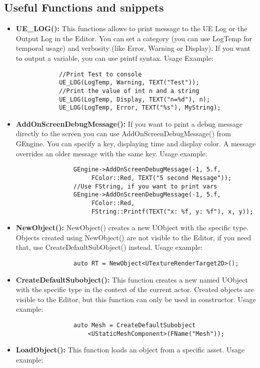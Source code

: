 \documentclass[10pt,a4paper]{article}
\begin{document}
\begin{multicols*}{2}
	\subsection{Useful Functions and snippets}
	\begin{itemize}
			\item \textbf{UE\_LOG():} This functions allows to print message to the UE Log or the Output Log in the Editor. You can set a category (you can use LogTemp for temporal usage) and verbosity (like Error, Warning or Display). If you want to output a variable, you can use printf syntax.  Usage Example:
			\begin{verbatim}
			//Print Test to console
			UE_LOG(LogTemp, Warning, TEXT("Test"));
			//Print the value of int n and a string
			UE_LOG(LogTemp, Display, TEXT("n=%d"), n);
			UE_LOG(LogTemp, Error, TEXT("%s"), MyString);
			\end{verbatim}
			\item \textbf{AddOnScreenDebugMessage():} If you want to print a debug message directly to the screen you can use AddOnScreenDebugMessage() from GEngine. You can specify a key, displaying time and display color. A message overrides an older message with the same key. Usage example:
			\begin{verbatim}
				GEngine->AddOnScreenDebugMessage(-1, 5.f, 
				     FColor::Red, TEXT("5 second Message"));
				//Use FString, if you want to print vars
				GEngine->AddOnScreenDebugMessage(-1, 5.f, 
				     FColor::Red, 
				     FString::Printf(TEXT("x: %f, y: %f"), x, y));
			\end{verbatim}
			\item \textbf{NewObject():} NewObject() creates a new UObject with the specific type. Objects created using NewObject() are not visible to the Editor, if you need that, use CreateDefaultSubObject() instead. Usage example:
			\begin{verbatim}
				auto RT = NewObject<UTextureRenderTarget2D>();
			\end{verbatim}
			\item \textbf{CreateDefaultSubobject():} This function creates a new named UObject with the specific type in the context of the current actor. Created objects are visible to the Editor, but this function can only be used in constructor. Usage example:
			\begin{verbatim}
				auto Mesh = CreateDefaultSubobject
				    <UStaticMeshComponent>(FName("Mesh"));
			\end{verbatim}
			\item \textbf{LoadObject():} This function loads an object from a specific asset. Usage example:

\end{itemize}
\end{multicols*}
\end{document}
